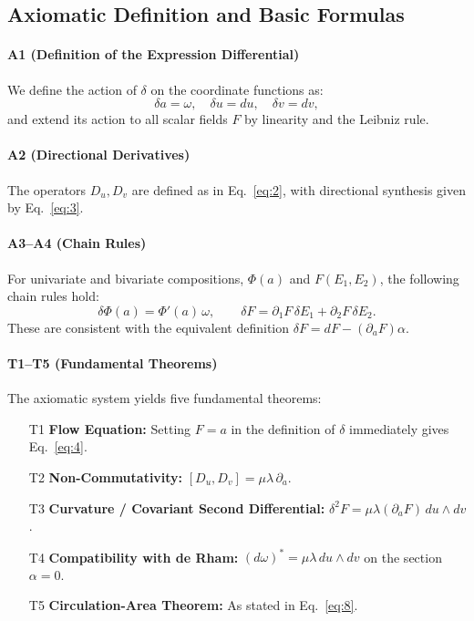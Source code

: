 \subsection{Axiomatic Definition and Basic Formulas}

\paragraph{A1 (Definition of the Expression Differential)}
We define the action of $\delta$ on the coordinate functions as:
\begin{equation}\label{eq:9}\tag{9}
\delta a=\omega,\quad \delta u=du,\quad \delta v=dv,
\end{equation}
and extend its action to all scalar fields $F$ by linearity and the Leibniz rule.

\paragraph{A2 (Directional Derivatives)} The operators $D_u, D_v$ are defined as in Eq.~\eqref{eq:2}, with directional synthesis given by Eq.~\eqref{eq:3}.

\paragraph{A3–A4 (Chain Rules)}
For univariate and bivariate compositions, $\Phi(a)$ and $F(E_1, E_2)$, the following chain rules hold:
\begin{equation}\label{eq:10-11}\tag{10-11}
\delta\Phi(a)=\Phi'(a)\,\omega,\qquad
\delta F=\partial_1F\,\delta E_1+\partial_2F\,\delta E_2.
\end{equation}
These are consistent with the equivalent definition $\delta F=dF-(\partial_aF)\alpha$.

\paragraph{T1–T5 (Fundamental Theorems)}
The axiomatic system yields five fundamental theorems:
\begin{itemize}
    \item[T1] \textbf{Flow Equation:} Setting $F=a$ in the definition of $\delta$ immediately gives Eq.~\eqref{eq:4}.
    \item[T2] \textbf{Non-Commutativity:} $[D_u,D_v]=\mu\lambda\,\partial_a$.
    \item[T3] \textbf{Curvature / Covariant Second Differential:} $\delta^2F=\mu\lambda(\partial_aF)\,du\wedge dv$.
    \item[T4] \textbf{Compatibility with de Rham:} $(d\omega)^*=\mu\lambda\,du\wedge dv$ on the section $\alpha=0$.
    \item[T5] \textbf{Circulation-Area Theorem:} As stated in Eq.~\eqref{eq:8}.
\end{itemize}

